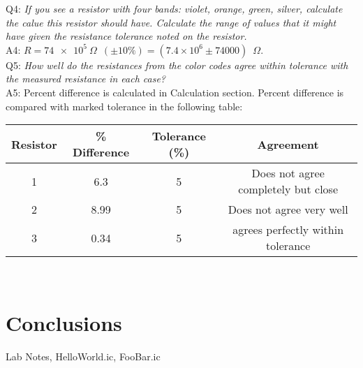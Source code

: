 \documentclass[letterpaper, 12pt]{article}
\begin{document}
	\noindent Q4: \emph{If you see a resistor with four bands: violet, orange, green, silver, calculate the calue this resistor should have. Calculate the range of values that it might have given the resistance tolerance noted on the resistor.}\\
	A4: $R= \SI{74e5}{\Omega}\enspace (\pm 10\%)=(7.4\times 10^6 \pm 74000)\enspace \Omega.$\\
	
	\noindent Q5: \emph{How well do the resistances from the color codes agree within tolerance with the measured resistance in each case?}\\
	A5: Percent difference is calculated in Calculation section. Percent difference is compared with marked tolerance in the following table:\\
	
	\begin{tabular}{c c c c}
		\toprule
		\bf Resistor & \bf \% Difference & \bf Tolerance (\%) & \bf Agreement \\ \midrule
		1 & 6.3 & 5 & Does not agree completely but close\\
		2 & 8.99 &  5  & Does not agree very well\\
		3 & 0.34 & 5 & agrees perfectly within tolerance\\ \bottomrule
	\end{tabular}\\

	

	
	
	
	



	
	\section*{Conclusions}
	\lipsum[7]
	
	Lab Notes, HelloWorld.ic, FooBar.ic
	
	
\end{document}
